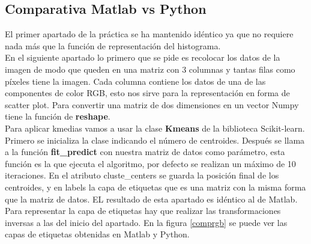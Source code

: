 \documentclass[a4paper,12pt]{report}
\begin{document}
\subsection{Comparativa Matlab vs Python}

El primer apartado de la práctica se ha mantenido idéntico ya que no requiere nada más que la función de representación del histograma.\\

En el siguiente apartado lo primero que se pide es recolocar los datos de la imagen de modo que queden en una matriz con 3 columnas y tantas filas como píxeles tiene la imagen. Cada columna contiene los datos de una de las componentes de color RGB, esto nos sirve para la representación en forma de scatter plot. Para convertir una matriz de dos dimensiones en un vector Numpy tiene la función de \textbf{reshape}. \\

Para aplicar kmedias vamos a usar la clase \textbf{Kmeans} de la biblioteca Scikit-learn. Primero se inicializa la clase indicando el número de centroides. Después se llama a la función \textbf{fit\_predict} con nuestra matriz de datos como parámetro, esta función es la que ejecuta el algoritmo, por defecto se realizan un máximo de 10 iteraciones. En el atributo cluste\_centers se guarda la posición final de los centroides, y en labels la capa de etiquetas que es una matriz con la misma forma que la matriz de datos. EL resultado de esta apartado es idéntico al de Matlab. \\

Para representar la capa de etiquetas hay que realizar las transformaciones inversas a las del inicio del apartado. En la figura \ref{comprgb} se puede ver las capas de etiquetas obtenidas en Matlab y Python. \\
\end{document}
